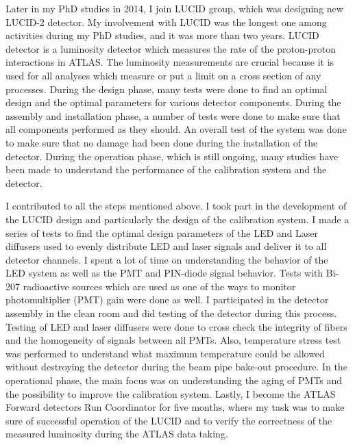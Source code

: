 \begin{preface}
Later in my PhD studies in 2014, I join LUCID group, which was designing new LUCID-2 detector. My involvement with LUCID was the longest one among activities during my PhD studies, and it was more than two years. LUCID detector is a luminosity detector which measures the rate of the proton-proton interactions in ATLAS. The luminosity measurements are crucial because it is used for all analyses which measure or put a limit on a cross section of any processes.
During the design phase, many tests were done to find an optimal design and the optimal parameters for various detector components.
During the assembly and installation phase, a number of tests were done to make sure that all components performed as they should.
An overall test of the system was done to make sure that no damage had been done during the installation of the detector.
During the operation phase, which is still ongoing, many studies have been made to understand the performance of the calibration system and the detector.

I contributed to all the steps mentioned above. I took part in the development of the LUCID design and particularly the design of the calibration system. 
I made a series of tests to find the optimal design parameters of the LED and Laser diffusers used to evenly distribute LED and laser signals and deliver it to all detector channels. 
I spent a lot of time on understanding the behavior of the LED system as well as the PMT and PIN-diode signal behavior.
Tests with Bi-207 radioactive sources which are used as one of the ways to monitor photomultiplier (PMT) gain were done as well.
I participated in the detector assembly in the clean room and did testing of the detector during this process.
Testing of LED and laser diffusers were done to cross check the integrity of fibers and the homogeneity of signals between all PMTs.
Also, temperature stress test was performed to understand what maximum temperature could be allowed without destroying the detector during the 
beam pipe bake-out procedure.
In the operational phase, the main focus was on understanding the aging of PMTs and the possibility to improve the calibration system.
Lastly, I become the ATLAS Forward detectors Run Coordinator for five months, where my task was to make sure of successful operation of the LUCID and to verify the correctness of the measured luminosity during the ATLAS data taking.



\end{preface}
